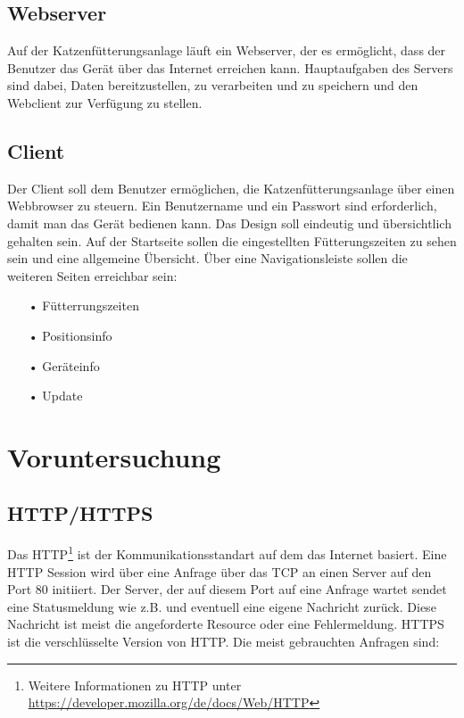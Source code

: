 \subsection{Webserver}
\label{sec:anf-server}
Auf der Katzenfütterungsanlage läuft ein Webserver, der es ermöglicht, dass der Benutzer das Gerät über das Internet erreichen kann. Hauptaufgaben des Servers sind dabei, Daten bereitzustellen, zu verarbeiten und zu speichern und den Webclient zur Verfügung zu stellen.

\subsection{Client}
\label{sec:anf-client}
Der Client soll dem Benutzer ermöglichen, die Katzenfütterungsanlage über einen Webbrowser zu steuern. Ein Benutzername und ein Passwort sind erforderlich, damit man das Gerät bedienen kann. Das Design soll eindeutig und übersichtlich gehalten sein. Auf der Startseite sollen die eingestellten Fütterungszeiten zu sehen sein und eine allgemeine Übersicht. Über eine Navigationsleiste sollen die weiteren Seiten erreichbar sein:

\begin{itemize}
\item[•]Fütterrungszeiten
\item[•]Positionsinfo
\item[•]Geräteinfo
\item[•]Update
\end{itemize}

\section{Voruntersuchung}
\label{sec:voruntersuchung}

\subsection{HTTP/HTTPS}
\label{sec:vor-http}
Das \ac{HTTP}\footnote{Weitere Informationen zu \ac{HTTP} unter \url{https://developer.mozilla.org/de/docs/Web/HTTP}} ist der Kommunikationsstandart auf dem das Internet basiert. Eine HTTP Session wird über eine Anfrage über das \ac{TCP} an einen Server auf den Port 80 initiiert. Der Server, der auf diesem Port auf eine Anfrage wartet sendet eine Statusmeldung wie z.B.  und eventuell eine eigene Nachricht zurück. Diese Nachricht ist meist die angeforderte Resource oder eine Fehlermeldung. \ac{HTTPS} ist die verschlüsselte Version von \ac{HTTP}. Die meist gebrauchten Anfragen sind:


